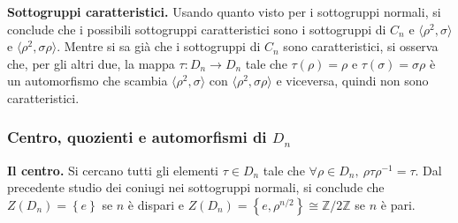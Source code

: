 \documentclass[12pt]{scrartcl}
\theoremstyle{style}
\numberwithin{equation}{subsection}
\begin{document}
\textbf{Sottogruppi caratteristici.}
Usando quanto visto per i sottogruppi normali, si conclude che i possibili sottogruppi caratteristici sono i sottogruppi di $C_n$ e $\langle \rho ^2,\sigma  \rangle$ e $\langle \rho ^2 , \sigma \rho  \rangle$. 
Mentre si sa gi\`a che i sottogruppi di $C_n$ sono caratteristici, si osserva che, per gli altri due, la mappa $\tau : D_n \to D_n$ tale che $\tau (\rho ) = \rho $ e $\tau (\sigma ) = \sigma \rho $ \`e un automorfismo che scambia $\langle \rho ^2,\sigma  \rangle$ con $\langle \rho ^2, \sigma \rho  \rangle$ e viceversa, quindi non sono caratteristici.
\subsubsection{Centro, quozienti e automorfismi di $D_n$}
\hfill

\textbf{Il centro.} Si cercano tutti gli elementi $\tau  \in D_n$ tale che $\forall \rho  \in D_n, \ \rho \tau \rho ^{-1}=\tau $.
Dal precedente studio dei coniugi nei sottogruppi normali, si conclude che $Z(D_n) = \left\{ e \right\} $ se $n$ \`e dispari e $Z(D_n)=\left\{ e, \rho ^{n / 2}  \right\}\cong \mathbb{Z} / 2\mathbb{Z}$ se $n$ \`e pari.

\vspace{5pt}
\end{document}
